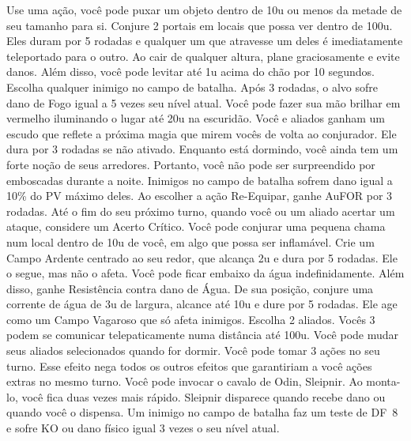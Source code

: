 %
\vfill
%
{Use uma ação, você pode puxar um objeto dentro de 10u ou menos da metade de seu tamanho para si.}
{Conjure 2 portais em locais que possa ver dentro de 100u. Eles duram por 5 rodadas e qualquer um que atravesse um deles é imediatamente teleportado para o outro.}
%
\vfill
%
{Ao cair de qualquer altura, plane graciosamente e evite danos. Além disso, você pode levitar até 1u acima do chão por 10 segundos.}
{Escolha qualquer inimigo no campo de batalha. Após 3 rodadas, o alvo sofre dano de Fogo igual a 5 vezes seu nível atual.}
%
\vfill
%
{Você pode fazer sua mão brilhar em vermelho iluminando o lugar até 20u na escuridão.}
{Você e aliados ganham um escudo que reflete a próxima magia que mirem vocês de volta ao conjurador. Ele dura por 3 rodadas se não ativado.}
%
\vfill
%
{Enquanto está dormindo, você ainda tem um forte noção de seus arredores. Portanto, você não pode ser surpreendido por emboscadas durante a noite.}
{Inimigos no campo de batalha sofrem dano igual a 10\% do PV máximo deles.}
%
\vfill
%
{Ao escolher a ação Re-Equipar, ganhe AuFOR por 3 rodadas.}
{Até o fim do seu próximo turno, quando você ou um aliado acertar um ataque, considere um Acerto Crítico.}
%
\vfill
%
{Você pode conjurar uma pequena chama num local dentro de 10u de você, em algo que possa ser inflamável.}
{Crie um Campo Ardente centrado ao seu redor, que alcança 2u e dura por 5 rodadas. Ele o segue, mas não o afeta.}
%
\vfill
%
{Você pode ficar embaixo da água indefinidamente. Além disso, ganhe Resistência contra dano de Água.}
{De sua posição, conjure uma corrente de água de 3u de largura, alcance até 10u e dure por 5 rodadas. Ele age como um Campo Vagaroso que só afeta inimigos.}
%
\vfill
%
{Escolha 2 aliados. Vocês 3 podem se comunicar telepaticamente numa distância até 100u. Você pode mudar seus aliados selecionados quando for dormir.}
{Você pode tomar 3 ações no seu turno. Esse efeito nega todos os outros efeitos que garantiriam a você ações extras no mesmo turno.}
%
\vfill
%
{Você pode invocar o cavalo de Odin, Sleipnir. Ao monta-lo, você fica duas vezes mais rápido. Sleipnir disparece quando recebe dano ou quando você o dispensa.}
{Um inimigo no campo de batalha faz um teste de DF~8 e sofre KO ou dano físico igual 3 vezes o seu nível atual.}
